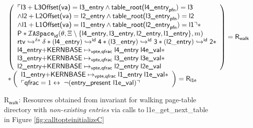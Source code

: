 \begin{figure}\footnotesize
$\begin{array}{l}\left( \begin{array}{l} \ulcorner \textsf{l3}+\textsf{L3Offset(va)} = \textsf{l3\_entry} \land \textsf{table\_root(l4\_entry}_{\textsf{pfn}})  = \textsf{l3} \\ \land \textsf{l2}+\textsf{L2Offset(va)} = \textsf{l2\_entry} \land \textsf{table\_root(l3\_entry}_{\textsf{pfn}})  = \textsf{l2} \\ \land \textsf{l1}+\textsf{L1Offset(va)} = \textsf{l1\_entry} \land \textsf{table\_root(l2\_entry}_{\textsf{pfn}})  = \textsf{l1} \urcorner  \ast \\  \textsf{P} \ast \mathcal{I}\texttt{ASpace}_{\textsf{id}}(\theta,\Xi\setminus\{\textsf{l4\_entry},\textsf{l3\_entry},\textsf{l2\_entry},\textsf{l1\_entry}\},m)  \\ \ghostmaptoken{\delta{}s}{\rtv}{\delta} \ast  
      \ghostmaptoken{\textsf{id}}{(\mathsf{l4\_entry})}{\textsf{4}}\ast \ghostmaptoken{\textsf{id}}{(\mathsf{l3\_entry})}{\textsf{3}} \ast \ghostmaptoken{\textsf{id}}{(\mathsf{l2\_entry})}{\textsf{2}}  \ast \\  \textsf{l4\_entry+KERNBASE} \mapsto_{\textsf{vpte,qfrac}} \textsf{l4\_entry} \; \textsf{l4e\_val}  \ast \\  \textsf{l3\_entry+KERNBASE} \mapsto_{\textsf{vpte,qfrac}} \textsf{l3\_entry}\;\textsf{l3e\_val}  \ast \\  \textsf{l2\_entry+KERNBASE} \mapsto_{\textsf{vpte,qfrac}} \textsf{l2\_entry} \; \textsf{l2e\_val}  \end{array} \right)  =\textsf{R}_{\textsf{walk} } 
    \\ \ast \left(\begin{array}{l}  \textsf{l1\_entry+KERNBASE} \mapsto_{\textsf{vpte,qfrac}} \textsf{l1\_entry}\;\textsf{l1e\_val} \ast \\ \ulcorner  \textsf{qfrac} = 1 \leftrightarrow \; \lnot(\textsf{entry\_present l1e\_val})\urcorner \end{array}\right) =\textsf{R}_{\textsf{l1e}}\end{array} $
\caption{\textsf{R}$_{\textsf{walk}}$: Resources obtained from invariant for walking page-table directory with \emph{non-existing entries} via calls to \textsf{l1e\_get\_next\_table} in Figure \ref{fig:calltopteinitializeC}}
\label{fig:rwalkC}
\vspace{-1em}
\end{figure}

